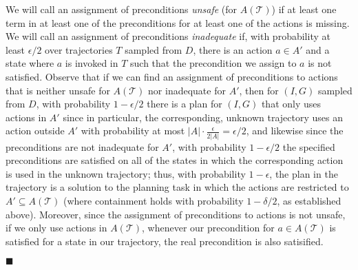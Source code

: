\documentclass[letterpaper]{article}
\newenvironment{proof}{\noindent{\bf Proof:~~}}{\qed}
\newcommand{\qed}{\hfill\ensuremath{\blacksquare}}
\begin{document}
\begin{proof}
We will call an assignment of preconditions {\em unsafe} (for $A(\mathcal{T})$) if at least one term in at least one of the preconditions for at least one of the actions is missing. We will call an assignment of preconditions {\em inadequate} if, with probability at least $\epsilon/2$ over trajectories $T$ sampled from $D$, there is an action $a\in A'$ and a state where $a$ is invoked in $T$ such that the precondition we assign to $a$ is not satisfied.  Observe that if we can find an assignment of preconditions to actions that is neither unsafe for $A(\mathcal{T})$ nor inadequate for $A'$, then for $(I,G)$ sampled from $D$, with probability $1-\epsilon/2$ there is a plan for $(I,G)$ that only uses actions in $A'$ since in particular, the corresponding, unknown trajectory uses an action outside $A'$ with probability at most $|A|\cdot\frac{\epsilon}{2|A|}=\epsilon/2$, and likewise since the preconditions are not inadequate for $A'$, with probability $1-\epsilon/2$ the specified preconditions are satisfied on all of the states in which the corresponding action is used in the unknown trajectory; thus, with probability $1-\epsilon$, the plan in the trajectory is a solution to the planning task in which the actions are restricted to $A'\subseteq A(\mathcal{T})$ (where containment holds with probability $1-\delta/2$, as established above). Moreover, since the assignment of preconditions to actions is not unsafe, if we only use actions in $A(\mathcal{T})$, whenever our precondition for $a\in A(\mathcal{T})$ is satisfied for a state in our trajectory, the real precondition is also satisified. 


\end{proof}
\end{document}
